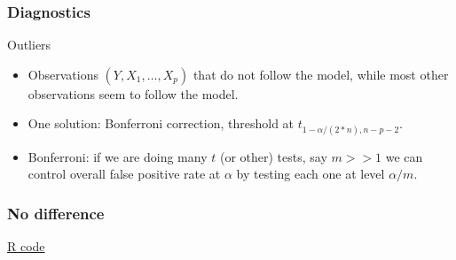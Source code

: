 \documentclass[handout]{beamer}
\begin{document}

   \begin{frame} \frametitle{Diagnostics}

   \begin{block}
   {Outliers}
   \begin{itemize}[<+->]
   \item Observations $(Y, X_1, \dots, X_p)$ that
   do not follow the model, while most other observations seem to follow the model.

   \item One solution: Bonferroni correction, threshold at
   $t_{1 - \alpha/(2*n), n-p-2}$.
   \item Bonferroni: if we
   are doing many $t$ (or other) tests, say $m >>1$ we can control
   overall false positive rate at $\alpha$ by testing each one at level $\alpha/m$.

   \end{itemize}
   \end{block}
   \end{frame}



   \begin{frame}
   \frametitle{No difference}
   \begin{center}
   \end{center}
   \href{http://stats191.stanford.edu/interactions.html#minority-employment-data}{R code}
   \end{frame}

\end{document}
